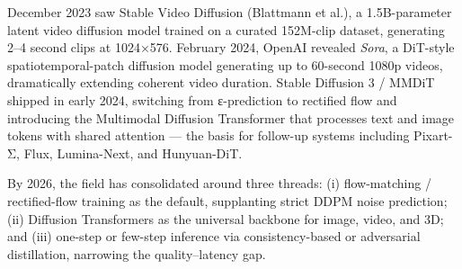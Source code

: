 \documentclass{article}
\begin{document}
December 2023 saw Stable Video Diffusion (Blattmann et al.), a 1.5B-parameter latent video diffusion model trained on a curated 152M-clip dataset, generating 2--4 second clips at 1024×576. February 2024, OpenAI revealed \emph{Sora}, a DiT-style spatiotemporal-patch diffusion model generating up to 60-second 1080p videos, dramatically extending coherent video duration. Stable Diffusion 3 / MMDiT \citep{esser20242024} shipped in early 2024, switching from ε-prediction to rectified flow and introducing the Multimodal Diffusion Transformer that processes text and image tokens with shared attention --- the basis for follow-up systems including Pixart-Σ, Flux, Lumina-Next, and Hunyuan-DiT.

By 2026, the field has consolidated around three threads: (i) flow-matching / rectified-flow training as the default, supplanting strict DDPM noise prediction; (ii) Diffusion Transformers as the universal backbone for image, video, and 3D; and (iii) one-step or few-step inference via consistency-based or adversarial distillation, narrowing the quality--latency gap.
\end{document}
